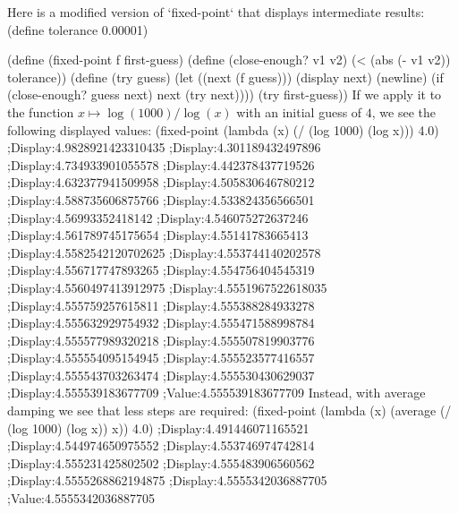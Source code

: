 Here is a modified version of `fixed-point` that displays intermediate results:
\begtt\scm 
(define tolerance 0.00001)

(define (fixed-point f first-guess)
  (define (close-enough? v1 v2)
    (< (abs (- v1 v2)) tolerance))
  (define (try guess)
    (let ((next (f guess)))
      (display next)
      (newline)
      (if (close-enough? guess next)
        next
        (try next))))
  (try first-guess))
\endtt
If we apply it to the function $x \mapsto \log(1000)/\log(x)$ with an initial guess of $4$, we see the following displayed values:
\begtt\scm 
(fixed-point (lambda (x) (/ (log 1000) (log x))) 4.0)
;Display:4.9828921423310435
;Display:4.301189432497896
;Display:4.734933901055578
;Display:4.442378437719526
;Display:4.632377941509958
;Display:4.505830646780212
;Display:4.588735606875766
;Display:4.533824356566501
;Display:4.56993352418142
;Display:4.546075272637246
;Display:4.561789745175654
;Display:4.55141783665413
;Display:4.5582542120702625
;Display:4.553744140202578
;Display:4.556717747893265
;Display:4.554756404545319
;Display:4.5560497413912975
;Display:4.5551967522618035
;Display:4.555759257615811
;Display:4.555388284933278
;Display:4.555632929754932
;Display:4.555471588998784
;Display:4.555577989320218
;Display:4.555507819903776
;Display:4.555554095154945
;Display:4.555523577416557
;Display:4.555543703263474
;Display:4.555530430629037
;Display:4.555539183677709
;Value:4.555539183677709
\endtt
Instead, with average damping we see that less steps are required:
\begtt\scm
(fixed-point (lambda (x) (average (/ (log 1000) (log x)) x)) 4.0)
;Display:4.491446071165521
;Display:4.544974650975552
;Display:4.553746974742814
;Display:4.555231425802502
;Display:4.555483906560562
;Display:4.5555268862194875
;Display:4.5555342036887705
;Value:4.5555342036887705
\endtt

